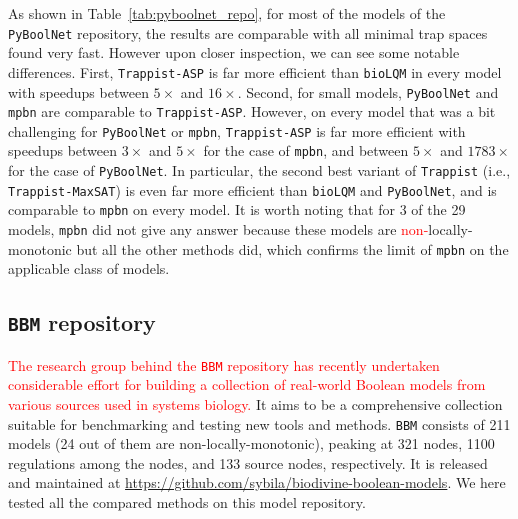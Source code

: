 \documentclass[preprint,12pt]{elsarticle}
\newcommand{\change}[1]{\textcolor{red}{#1}}
\begin{document}
As shown in Table~\ref{tab:pyboolnet_repo}, for most of the models of the \texttt{PyBoolNet} repository, the results are comparable with all minimal trap spaces found very fast.
However upon closer inspection, we can see some notable differences.
First, \texttt{Trappist-ASP} is far more efficient than \texttt{bioLQM} in every model with speedups between \(5\times\) and \(16 \times\).
Second, for small models, \texttt{PyBoolNet} and \texttt{mpbn} are comparable to \texttt{Trappist-ASP}.
However, on every model that was a bit challenging for \texttt{PyBoolNet} or \texttt{mpbn}, \texttt{Trappist-ASP} is far more efficient with speedups between \(3\times\) and \(5 \times\) for the case of \texttt{mpbn}, and between \(5\times\) and \(1783 \times\) for the case of \texttt{PyBoolNet}.
In particular, the second best variant of \texttt{Trappist} (i.e., \texttt{Trappist-MaxSAT}) is even far more efficient than \texttt{bioLQM} and \texttt{PyBoolNet}, and is comparable to \texttt{mpbn} on every model.
It is worth noting that for 3 of the 29 models, \texttt{mpbn} did not give any answer because these models are \change{non-}locally-monotonic but all the other methods did, which confirms the limit of \texttt{mpbn} on the applicable class of models.


\subsection{\texttt{BBM} repository}

\change{The research group behind the \texttt{BBM} repository has recently undertaken considerable effort for building a collection of real-world Boolean models from various sources used in systems biology.}
It aims to be a comprehensive collection suitable for benchmarking and testing new tools and methods.
\texttt{BBM} consists of 211 models (24 out of them are non-locally-monotonic), peaking at 321 nodes, 1100 regulations among the nodes, and 133 source nodes, respectively.
It is released and maintained at \url{https://github.com/sybila/biodivine-boolean-models}.
We here tested all the compared methods on this model repository.
\end{document}
